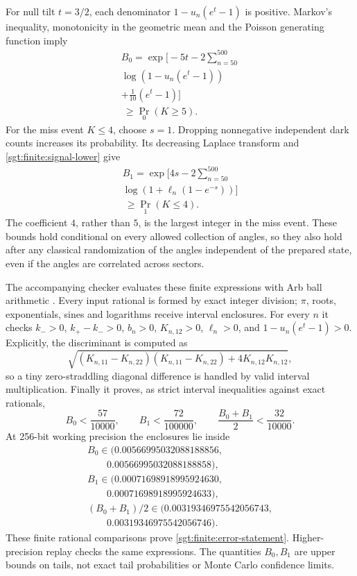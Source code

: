 \documentclass[aps,pra,reprint,superscriptaddress,longbibliography]{revtex4-2}
\begin{document}
For null tilt $t=3/2$, each denominator
$1-u_n(e^t-1)$ is positive. Markov's inequality, monotonicity in the
geometric mean and the Poisson generating function imply
\begin{equation}
\begin{gathered}
 B_0=\exp\bigl[-5t-2\sum_{n=50}^{500}
\\
             \log(1-u_n(e^t-1))\\
+\tfrac1{10}(e^t-1)\bigr]
\\
 \ \ge\Pr_0(K\ge5).
 \label{sgt:finite:null-chernoff}
\end{gathered}
\end{equation}
For the miss event $K\le4$, choose $s=1$. Dropping nonnegative
independent dark counts increases its probability. Its decreasing
Laplace transform and \eqref{sgt:finite:signal-lower} give
\begin{equation}
\begin{gathered}
 B_1=\exp\bigl[4s-2\sum_{n=50}^{500}
\\
              \log(1+\ell_n(1-e^{-s}))\bigr]
\\
 \ \ge\Pr_1(K\le4).
 \label{sgt:finite:signal-chernoff}
\end{gathered}
\end{equation}
The coefficient $4$, rather than $5$, is the largest integer in the
miss event. These bounds hold conditional on every allowed collection
of angles, so they also hold after any classical randomization of
the angles independent of the prepared state, even if the angles
are correlated across sectors.

The accompanying checker evaluates these finite expressions with
Arb ball arithmetic \cite{Johansson2017}. Every input rational is
formed by exact integer division; $\pi$, roots, exponentials, sines
and logarithms receive interval enclosures. For every $n$ it checks
$k_->0$, $k_+-k_->0$, $b_n>0$, $K_{n,12}>0$, $\ell_n>0$, and
$1-u_n(e^t-1)>0$. Explicitly, the discriminant is computed as
\[
 \sqrt{(K_{n,11}-K_{n,22})(K_{n,11}-K_{n,22})+4K_{n,12}K_{n,12}},
\]
so a tiny zero-straddling diagonal difference is handled by valid
interval multiplication. Finally it proves, as strict interval
inequalities against exact rationals,
\[
 B_0<\frac{57}{10000},\qquad
 B_1<\frac{72}{100000},\qquad
 \frac{B_0+B_1}{2}<\frac{32}{10000}.
\]
At 256-bit working precision the enclosures lie inside
\begin{gather*}
 B_0\in(0.00566995032088188856,\\
 \hspace{2em}0.00566995032088188858),\\
 B_1\in(0.00071698918995924630,\\
 \hspace{2em}0.00071698918995924633),\\
 (B_0+B_1)/2\in(0.00319346975542056743,\\
 \hspace{2em}0.00319346975542056746).
\end{gather*}
These finite rational comparisons prove
\eqref{sgt:finite:error-statement}. Higher-precision replay checks
the same expressions. The quantities $B_0,B_1$ are upper bounds on
tails, not exact tail probabilities or Monte Carlo confidence limits.
\end{document}
